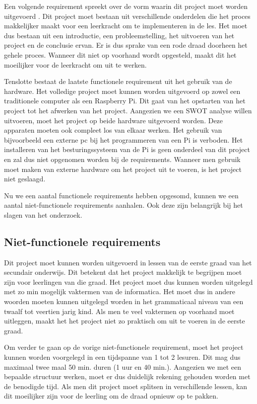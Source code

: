 Een volgende requirement spreekt over de vorm waarin dit project moet worden uitgevoerd . Dit project moet bestaan uit verschillende onderdelen die het proces makkelijker maakt voor een leerkracht om te implementeren in de les. Het moet dus bestaan uit een introductie, een  probleemstelling, het uitvoeren van het project en de conclusie ervan. Er is dus sprake van een rode draad doorheen het gehele proces. Wanneer dit niet op voorhand wordt opgesteld, maakt dit het moeilijker voor de leerkracht om uit te werken. 

Tenslotte bestaat de laatste functionele requirement uit het gebruik van de hardware. Het volledige project moet kunnen worden uitgevoerd op zowel een traditionele computer als een Raspberry Pi. Dit gaat van het opstarten van het project tot het afwerken van het project. Aangezien we een SWOT analyse willen uitvoeren, moet het project op beide hardware uitgevoerd worden. Deze apparaten moeten ook compleet los van elkaar werken. Het gebruik van bijvoorbeeld een externe pc bij het programmeren van een Pi is verboden. Het installeren van het besturingssysteem van de Pi is geen onderdeel van dit project en zal dus niet opgenomen worden bij de requirements. Wanneer men gebruik moet maken van externe hardware om het project uit te voeren, is het project niet geslaagd.

Nu we een aantal functionele requirements hebben opgesomd, kunnen we een aantal niet-functionele requirements aanhalen. Ook deze zijn belangrijk bij het slagen van het onderzoek.

\subsection{Niet-functionele requirements}

Dit project moet kunnen worden uitgevoerd in lessen van de eerste graad van het secundair onderwijs. Dit betekent dat het project makkelijk te begrijpen moet zijn voor leerlingen van die graad. Het project moet dus kunnen worden uitgelegd met zo min mogelijk vaktermen van de informatica. Het moet dus in andere woorden moeten kunnen uitgelegd worden in het grammaticaal niveau van een twaalf tot veertien jarig kind. Als men te veel vaktermen op voorhand moet uitleggen, maakt het het project niet zo praktisch om uit te voeren in de eerste graad.

Om verder te gaan op de vorige niet-functionele requirement, moet het project kunnen worden voorgelegd in een tijdspanne van 1 tot 2 lesuren. Dit mag dus maximaal twee maal 50 min. duren (1 uur en 40 min.). Aangezien we met een bepaalde structuur werken, moet er dus duidelijk rekening gehouden worden met de benodigde tijd. Als men dit project moet splitsen in verschillende lessen, kan dit moeilijker zijn voor de leerling om de draad opnieuw op te pakken.

